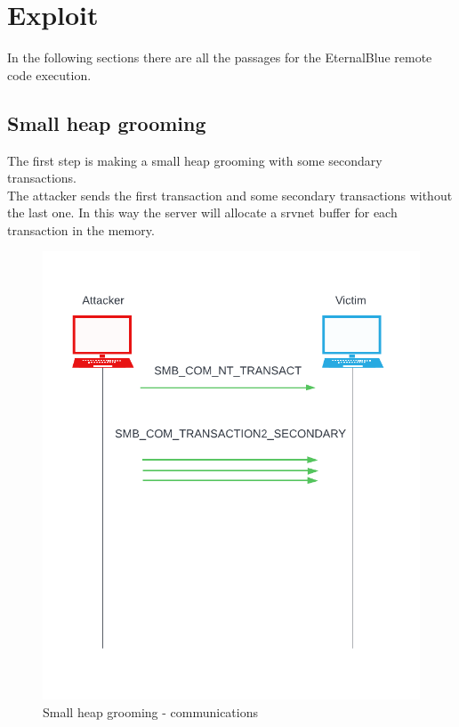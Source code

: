 \section{Exploit}
In the following sections there are all the passages for the EternalBlue remote code execution.

\subsection{Small heap grooming}
The first step is making a small heap grooming with some secondary transactions.\\
The attacker sends the first transaction and some secondary transactions without the last one. In this way the server will allocate 
a srvnet buffer for each transaction in the memory.
\begin{figure}[ht!]
    \centering
      \includegraphics[scale=0.5]{images/exploit_1_comm.png}
      \caption{Small heap grooming - communications}
\end{figure}

